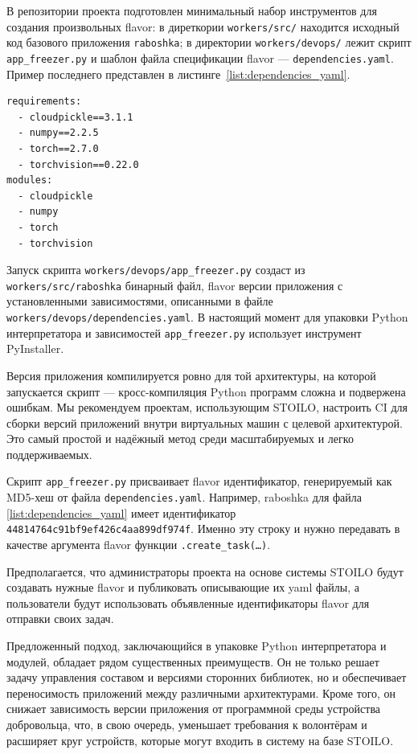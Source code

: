 \documentclass[a4paper,12pt]{extarticle}
\begin{document}
В репозитории проекта подготовлен минимальный набор инструментов для создания произвольных flavor: в диреткории \texttt{workers/src/} находится исходный код базового приложения \texttt{raboshka}; в директории \texttt{workers/devops/} лежит скрипт \texttt{app\_freezer.py} и шаблон файла спецификации flavor — \texttt{dependencies.yaml}. Пример последнего представлен в листинге~\ref{list:dependencies_yaml}.

\begin{lstlisting}[caption={Пример \texttt{dependencies.yaml} — файла спецификации flavor raboshka. Поскольку имена дистрибутивов и модулей верхнего уровня совпадают, данный пример выглядит вырождено, но в общем случае имена библиотек и моделей могут различаться.}, label={list:dependencies_yaml}]
requirements:
  - cloudpickle==3.1.1
  - numpy==2.2.5
  - torch==2.7.0
  - torchvision==0.22.0
modules:
  - cloudpickle
  - numpy
  - torch
  - torchvision  
\end{lstlisting}

Запуск скрипта \texttt{workers/devops/app\_freezer.py} создаст из \texttt{workers/src/raboshka} бинарный файл, flavor версии приложения с установленными зависимостями, описанными в файле \texttt{workers/devops/dependencies.yaml}. В настоящий момент для упаковки Python интерпретатора и зависимостей \texttt{app\_freezer.py} использует инструмент PyInstaller.

Версия приложения компилируется ровно для той архитектуры, на которой запускается скрипт — кросс-компиляция Python программ сложна и подвержена ошибкам. Мы рекомендуем проектам, использующим STOILO, настроить CI для сборки версий приложений внутри виртуальных машин с целевой архитектурой. Это самый простой и надёжный метод среди масштабируемых и легко поддерживаемых.

Скрипт \texttt{app\_freezer.py} присваивает flavor идентификатор, генерируемый как MD5-хеш от файла \texttt{dependencies.yaml}. Например, raboshka для файла \ref{list:dependencies_yaml} имеет идентификатор \texttt{44814764c91bf9ef426c4aa899df974f}. Именно эту строку и нужно передавать в качестве аргумента flavor функции \texttt{.create\_task(\ldots)}.

Предполагается, что администраторы проекта на основе системы STOILO будут создавать нужные flavor и публиковать описывающие их yaml файлы, а пользователи будут использовать объявленные идентификаторы flavor для отправки своих задач.

Предложенный подход, заключающийся в упаковке Python интерпретатора и модулей, обладает рядом существенных преимуществ. Он не только решает задачу управления составом и версиями сторонних библиотек, но и обеспечивает переносимость приложений между различными архитектурами. Кроме того, он снижает зависимость версии приложения от программной среды устройства добровольца, что, в свою очередь, уменьшает требования к волонтёрам и расширяет круг устройств, которые могут входить в систему на базе STOILO.
\end{document}
